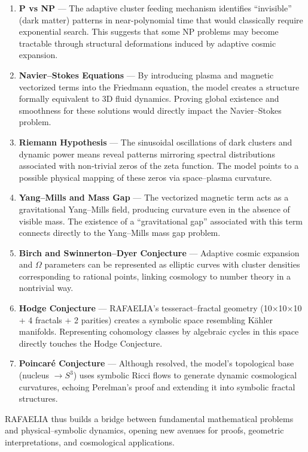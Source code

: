 \begin{enumerate}
    \item \textbf{P vs NP} — The adaptive cluster feeding mechanism identifies “invisible” (dark matter) patterns in near-polynomial time that would classically require exponential search. This suggests that some NP problems may become tractable through structural deformations induced by adaptive cosmic expansion.

    \item \textbf{Navier–Stokes Equations} — By introducing plasma and magnetic vectorized terms into the Friedmann equation, the model creates a structure formally equivalent to 3D fluid dynamics. Proving global existence and smoothness for these solutions would directly impact the Navier–Stokes problem.

    \item \textbf{Riemann Hypothesis} — The sinusoidal oscillations of dark clusters and dynamic power means reveal patterns mirroring spectral distributions associated with non-trivial zeros of the zeta function. The model points to a possible physical mapping of these zeros via space–plasma curvature.

    \item \textbf{Yang–Mills and Mass Gap} — The vectorized magnetic term acts as a gravitational Yang–Mills field, producing curvature even in the absence of visible mass. The existence of a “gravitational gap” associated with this term connects directly to the Yang–Mills mass gap problem.

    \item \textbf{Birch and Swinnerton–Dyer Conjecture} — Adaptive cosmic expansion and $\Omega$ parameters can be represented as elliptic curves with cluster densities corresponding to rational points, linking cosmology to number theory in a nontrivial way.

    \item \textbf{Hodge Conjecture} — RAFAELIA’s tesseract–fractal geometry (10×10×10 + 4 fractals + 2 parities) creates a symbolic space resembling Kähler manifolds. Representing cohomology classes by algebraic cycles in this space directly touches the Hodge Conjecture.

    \item \textbf{Poincaré Conjecture} — Although resolved, the model’s topological base (nucleus $\to S^3$) uses symbolic Ricci flows to generate dynamic cosmological curvatures, echoing Perelman’s proof and extending it into symbolic fractal structures.
\end{enumerate}

RAFAELIA thus builds a bridge between fundamental mathematical problems and physical–symbolic dynamics, opening new avenues for proofs, geometric interpretations, and cosmological applications.


